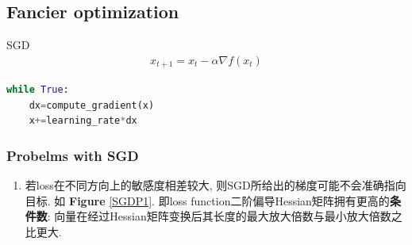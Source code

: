 \subsection{Fancier optimization}
SGD
\begin{align*}
    x_{t+1}=x_t-\alpha\nabla f(x_t)
\end{align*}
\begin{lstlisting}[language={python}]
while True:
    dx=compute_gradient(x)
    x+=learning_rate*dx
\end{lstlisting}

\subsubsection{Probelms with SGD}
\begin{enumerate}
    \item 若loss在不同方向上的敏感度相差较大, 则SGD所给出的梯度可能不会准确指向目标. 如 \textbf{Figure} \ref{SGDP1}. 即loss function二阶偏导Hessian矩阵拥有更高的\textbf{条件数}: 向量在经过Hessian矩阵变换后其长度的最大放大倍数与最小放大倍数之比更大. 


\end{enumerate}
